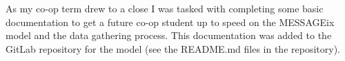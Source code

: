 \documentclass{article}
\begin{document}
As my co-op term drew to a close I was tasked with completing some basic documentation to get a future co-op student up to speed on the MESSAGEix model and the data gathering process. This documentation was added to the GitLab repository for the model (see the README.md files in the repository).







\end{document}
